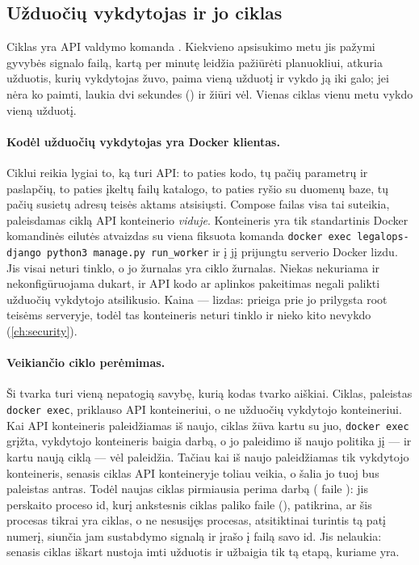 \subsection{Užduočių vykdytojas ir jo ciklas}

Ciklas yra API valdymo komanda . Kiekvieno apsisukimo metu jis pažymi gyvybės
signalo failą, kartą per minutę leidžia pažiūrėti planuokliui, atkuria užduotis, kurių
vykdytojas žuvo, paima vieną užduotį ir vykdo ją iki galo; jei nėra ko paimti, laukia dvi
sekundes () ir žiūri vėl. Vienas ciklas vienu metu vykdo vieną užduotį.

\paragraph{Kodėl užduočių vykdytojas yra Docker klientas.} Ciklui reikia lygiai to, ką turi
API: to paties kodo, tų pačių parametrų ir paslapčių, to paties įkeltų failų katalogo, to
paties ryšio su duomenų baze, tų pačių susietų adresų teisės aktams atsisiųsti. Compose failas
visa tai suteikia, paleisdamas ciklą API konteinerio \emph{viduje}. Konteineris
 yra tik standartinis Docker komandinės eilutės atvaizdas su viena
fiksuota komanda \texttt{docker exec legalops-django python3 manage.py run\_worker} ir į jį
prijungtu serverio Docker lizdu. Jis visai neturi tinklo, o jo žurnalas yra ciklo žurnalas.
Niekas nekuriama ir nekonfigūruojama dukart, ir API kodo ar aplinkos pakeitimas negali
palikti užduočių vykdytojo atsilikusio. Kaina --- lizdas: prieiga prie jo prilygsta root
teisėms serveryje, todėl tas konteineris neturi tinklo ir nieko kito nevykdo
(\cref{ch:security}).

\paragraph{Veikiančio ciklo perėmimas.} Ši tvarka turi vieną nepatogią savybę, kurią kodas
tvarko aiškiai. Ciklas, paleistas \texttt{docker exec}, priklauso API konteineriui, o ne
užduočių vykdytojo konteineriui. Kai API konteineris paleidžiamas iš naujo, ciklas žūva kartu
su juo, \texttt{docker exec} grįžta, vykdytojo konteineris baigia darbą, o jo paleidimo iš
naujo politika jį --- ir kartu naują ciklą --- vėl paleidžia. Tačiau kai iš naujo paleidžiamas
tik vykdytojo konteineris, senasis ciklas API konteineryje toliau veikia, o šalia jo tuoj bus
paleistas antras. Todėl naujas ciklas pirmiausia perima darbą ( faile
): jis
perskaito proceso id, kurį ankstesnis ciklas paliko faile (),
 patikrina, ar šis procesas tikrai yra  ciklas, o ne nesusijęs
procesas, atsitiktinai turintis tą patį numerį, siunčia jam sustabdymo signalą ir įrašo į
failą savo id. Jis nelaukia: senasis ciklas iškart nustoja imti užduotis ir užbaigia tik tą
etapą, kuriame yra.

